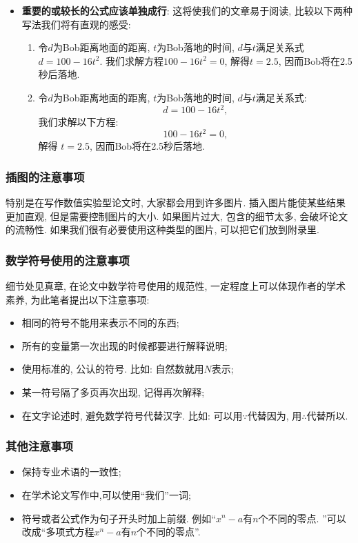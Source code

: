 \documentclass{booki}
\begin{document}
\begin{itemize}
    \item {\textbf{重要的或较长的公式应该单独成行}}: 这将使我们的文章易于阅读, 比较以下两种写法我们将有直观的感受:
          \begin{enumerate}
              \item 令$d$为Bob距离地面的距离, $t$为Bob落地的时间, $d$与$t$满足关系式$d = 100 − 16t^{2}$. 我们求解方程$100 − 16t^{2} = 0$, 解得$t =2.5$, 因而Bob将在2.5秒后落地.
              \item 令$d$为Bob距离地面的距离, $t$为Bob落地的时间, $d$与$t$满足关系式:
                    \begin{equation*}
                        d = 100 − 16t^{2},
                    \end{equation*}
                    我们求解以下方程:
                    \begin{equation*}
                        100 − 16t^{2} =0,
                    \end{equation*}
                    解得 $t =2.5$, 因而Bob将在2.5秒后落地.
          \end{enumerate}
\end{itemize}
\subsubsection{插图的注意事项}
特别是在写作数值实验型论文时, 大家都会用到许多图片. 插入图片能使某些结果更加直观, 但是需要控制图片的大小. 如果图片过大, 包含的细节太多, 会破坏论文的流畅性. 如果我们很有必要使用这种类型的图片, 可以把它们放到附录里.
\subsubsection{数学符号使用的注意事项}
细节处见真章{, 在论文中数学符号使用的规范性, 一定程度上可以体现作者的学术素养}, 为此笔者提出以下注意事项:
\begin{itemize}
    \item 相同的符号不能用来表示不同的东西{;}
    \item 所有的变量第一次出现的时候都要进行解释说明{;}
    \item 使用标准的, 公认的符号. 比如: 自然数就用$N$表示{;}
    \item 某一符号隔了多页再次出现, 记得再次解释{;}
    \item 在文字论述时, 避免数学符号代替汉字. 比如: 可以用$\because$代替因为, 用$\therefore$代替所以{.}
\end{itemize}
\subsubsection{其他注意事项}
\begin{itemize}
    \item {保持专业术语的一致性}{;}
    \item {在学术论文写作中,可以使用{``}我们''一词}{;}
    \item {符号或者公式作为句子开头时加上前缀.} 例如{``}$x^{n}-a$有$n$个不同的零点. ''可以改成{``}多项式方程$x^{n}-a$有$n$个不同的零点''{.}
\end{itemize}
\end{document}
